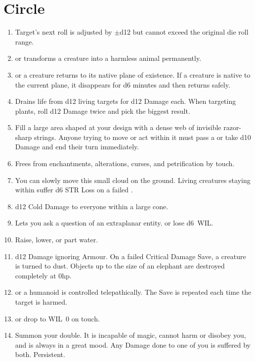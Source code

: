 \documentclass[itdr/core]{subfiles}
\begin{document}
\section{ Circle}
\def \spellcircle {5}
\begin{enumerate}
	\item {} Target's next roll is adjusted by $\pm$d12 but cannot exceed the original die roll range.
	\item {}  or transforms a creature into a harmless animal permanently.
	\item {}  or a creature returns to its native plane of existence. If a creature is native to the current plane, it disappears for d6 minutes and then returns safely.
	\item {} Drains life from d12 living targets for d12 Damage each. When targeting plants, roll d12 Damage twice and pick the biggest result.
	\item {} Fill a large area shaped at your design with a dense web of invisible razor-sharp strings. Anyone trying to move or act within it must pass a  or take d10 Damage and end their turn immediately.
	\item {} Frees from enchantments, alterations, curses, and petrification by touch.
	\item {} You can slowly move this small cloud on the ground. Living creatures staying within suffer d6 STR Loss on a failed .
	\item {} d12 Cold Damage to everyone within a large cone.
	\item {} Lets you ask a question of an extraplanar entity.  or lose d6~WIL.
	\item {} Raise, lower, or part water.
	\item {} d12 Damage ignoring Armour. On a failed Critical Damage Save, a creature is turned to dust. Objects up to the size of an elephant are destroyed completely at 0hp.
	\item {}  or a humanoid is controlled telepathically. The Save is repeated each time the target is harmed.
	\item {}  or drop to WIL~0 on touch.
	\item {} Summon your double. It is incapable of magic, cannot harm or disobey you, and is always in a great mood. Any Damage done to one of you is suffered by both. \mbox{Persistent.}

\end{enumerate}
\end{document}

